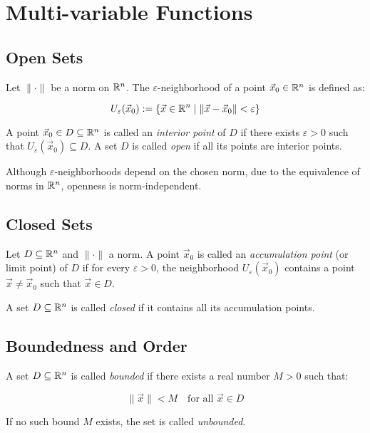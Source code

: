 \newpage
\section{Multi-variable Functions}

\subsection{Open Sets}

Let \( \| \cdot \| \) be a norm on \( \mathbb{R}^n \). The \( \varepsilon \)-neighborhood of a 
point \( \vec{x}_0 \in \mathbb{R}^n \) is defined as:

\[
    U_\varepsilon(\vec{x}_0) := \left\{ \vec{x} \in \mathbb{R}^n \mid \| \vec{x} - \vec{x}_0 \| 
    < \varepsilon \right\}
\]

A point \( \vec{x}_0 \in D \subseteq \mathbb{R}^n \) is called an \emph{interior point} of \( D \) 
if there exists \( \varepsilon > 0 \) such that \( U_\varepsilon(\vec{x}_0) \subseteq D \).  
A set \( D \) is called \emph{open} if all its points are interior points.
\vspace{\baselineskip}

Although \( \varepsilon \)-neighborhoods depend on the chosen norm, due to the equivalence of norms 
in \( \mathbb{R}^n \), openness is norm-independent.

\subsection{Closed Sets}

Let \( D \subseteq \mathbb{R}^n \) and \( \| \cdot \| \) a norm. A point \( \vec{x}_0 \) is called 
an \emph{accumulation point} (or limit point) of \( D \) if for every \( \varepsilon > 0 \), the 
neighborhood \( U_\varepsilon(\vec{x}_0) \) contains a point \( \vec{x} \ne \vec{x}_0 \) such that 
\( \vec{x} \in D \).

A set \( D \subseteq \mathbb{R}^n \) is called \emph{closed} if it contains all its accumulation points.

\subsection{Boundedness and Order}

A set \( D \subseteq \mathbb{R}^n \) is called \emph{bounded} if there exists a real number \( M > 0 \) 
such that:

\[
    \|\vec{x}\| < M \quad \text{for all } \vec{x} \in D
\]

If no such bound \( M \) exists, the set is called \emph{unbounded}.

